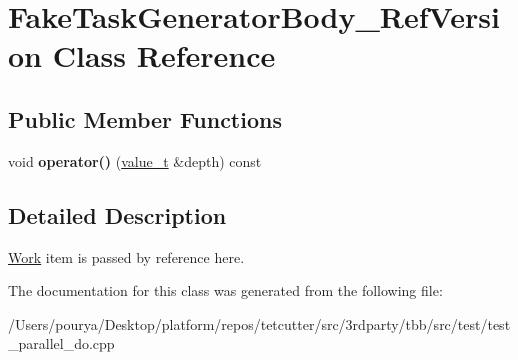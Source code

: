 \hypertarget{classFakeTaskGeneratorBody__RefVersion}{}\section{Fake\+Task\+Generator\+Body\+\_\+\+Ref\+Version Class Reference}
\label{classFakeTaskGeneratorBody__RefVersion}
\subsection*{Public Member Functions}
\begin{DoxyCompactItemize}
\item 
\hypertarget{classFakeTaskGeneratorBody__RefVersion_ab6319b4d1ed4d8cc65417a688e6cde98}{}void {\bfseries operator()} (\hyperlink{classvalue__t}{value\+\_\+t} \&depth) const \label{classFakeTaskGeneratorBody__RefVersion_ab6319b4d1ed4d8cc65417a688e6cde98}

\end{DoxyCompactItemize}


\subsection{Detailed Description}
\hyperlink{structWork}{Work} item is passed by reference here. 

The documentation for this class was generated from the following file\+:\begin{DoxyCompactItemize}
\item 
/\+Users/pourya/\+Desktop/platform/repos/tetcutter/src/3rdparty/tbb/src/test/test\+\_\+parallel\+\_\+do.\+cpp\end{DoxyCompactItemize}
